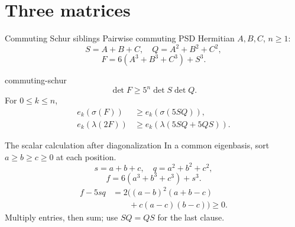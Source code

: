 \documentclass{beamer}
\begin{document}
\section{Three matrices}
\begin{frame}{Commuting Schur siblings}
Pairwise commuting PSD Hermitian $A,B,C$, $n\geq1$:
\[
S=A+B+C,\quad Q=A^2+B^2+C^2,
\]
\[
F=6(A^3+B^3+C^3)+S^3.
\]
\begin{bookresult}{commuting-schur}
\[
\det F\geq5^n\det S\det Q.
\]
For $0\leq k\leq n$,
\begin{align*}
e_k(\sigma(F))&\geq e_k(\sigma(5SQ)),\\
e_k(\lambda(2F))&\geq e_k(\lambda(5SQ+5QS)).
\end{align*}
\end{bookresult}
\end{frame}
\begin{frame}{The scalar calculation after diagonalization}
In a common eigenbasis, sort $a\geq b\geq c\geq0$ at each position.
\[
s=a+b+c,\quad q=a^2+b^2+c^2,
\]
\[
f=6(a^3+b^3+c^3)+s^3.
\]
\begin{align*}
f-5sq&=2\bigl((a-b)^2(a+b-c)\\
&\hspace{2em}+c(a-c)(b-c)\bigr)\geq0.
\end{align*}
Multiply entries, then sum; use $SQ=QS$ for the last clause.

\end{frame}
\FormalVerification
\end{document}
